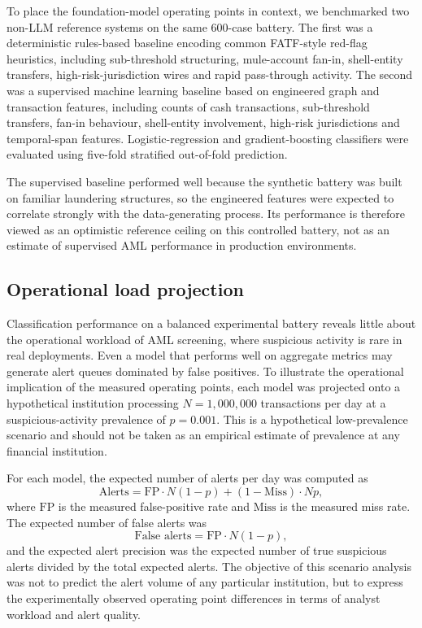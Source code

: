 \documentclass[pdflatex,sn-basic,Numbered]{sn-jnl}
\begin{document}
To place the foundation-model operating points in context, we benchmarked two non-LLM reference systems on the same 600-case battery. The first was a deterministic rules-based baseline encoding common FATF-style red-flag heuristics, including sub-threshold structuring, mule-account fan-in, shell-entity transfers, high-risk-jurisdiction wires and rapid pass-through activity. The second was a supervised machine learning baseline based on engineered graph and transaction features, including counts of cash transactions, sub-threshold transfers, fan-in behaviour, shell-entity involvement, high-risk jurisdictions and temporal-span features. Logistic-regression and gradient-boosting classifiers were evaluated using five-fold stratified out-of-fold prediction.

The supervised baseline performed well because the synthetic battery was built on familiar laundering structures, so the engineered features were expected to correlate strongly with the data-generating process. Its performance is therefore viewed as an optimistic reference ceiling on this controlled battery, not as an estimate of supervised AML performance in production environments.

\subsection{Operational load projection}

Classification performance on a balanced experimental battery reveals little about the operational workload of AML screening, where suspicious activity is rare in real deployments. Even a model that performs well on aggregate metrics may generate alert queues dominated by false positives. To illustrate the operational implication of the measured operating points, each model was projected onto a hypothetical institution processing $N = 1{,}000{,}000$ transactions per day at a suspicious-activity prevalence of $p = 0.001$. This is a hypothetical low-prevalence scenario and should not be taken as an empirical estimate of prevalence at any financial institution.

For each model, the expected number of alerts per day was computed as
\[
\text{Alerts} = \mathrm{FP}\cdot N(1-p) + (1-\mathrm{Miss})\cdot Np,
\]
where $\mathrm{FP}$ is the measured false-positive rate and $\mathrm{Miss}$ is the measured miss rate. The expected number of false alerts was
\[
\text{False alerts} = \mathrm{FP}\cdot N(1-p),
\]
and the expected alert precision was the expected number of true suspicious alerts divided by the total expected alerts. The objective of this scenario analysis was not to predict the alert volume of any particular institution, but to express the experimentally observed operating point differences in terms of analyst workload and alert quality.
\end{document}
